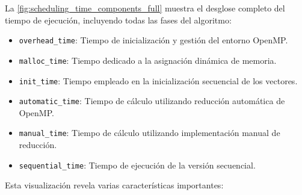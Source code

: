         La \autoref{fig:scheduling_time_components_full} muestra el desglose completo del tiempo de ejecución, incluyendo todas las fases del algoritmo:
        
        \begin{itemize}
        
            \item \texttt{overhead\_time}: Tiempo de inicialización y gestión del entorno OpenMP.
            
            \item \texttt{malloc\_time}: Tiempo dedicado a la asignación dinámica de memoria.
            
            \item \texttt{init\_time}: Tiempo empleado en la inicialización secuencial de los vectores.
            
            \item \texttt{automatic\_time}: Tiempo de cálculo utilizando reducción automática de OpenMP.
            
            \item \texttt{manual\_time}: Tiempo de cálculo utilizando implementación manual de reducción.
            
            \item \texttt{sequential\_time}: Tiempo de ejecución de la versión secuencial.
            
        \end{itemize}
    
        Esta visualización revela varias características importantes:
    
